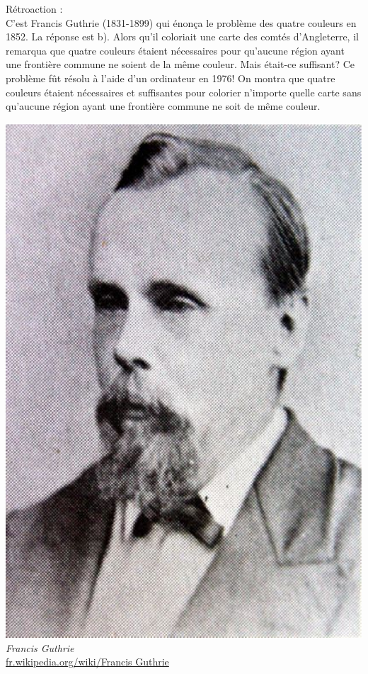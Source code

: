 \documentclass[letterpaper, 12pt]{article}
\begin{document}
R\'etroaction :\\
C'est Francis Guthrie (1831-1899) qui \'enon\c ca le probl\`eme des quatre couleurs en 1852. La r\'eponse est b). Alors qu'il coloriait une carte des comt\'es d'Angleterre, il remarqua que quatre couleurs \'etaient n\'ecessaires pour qu'aucune r\'egion ayant une fronti\`ere commune ne soient de la m\^eme couleur. Mais \'etait-ce suffisant? Ce probl\`eme f\^ut r\'esolu \`a l'aide d'un ordinateur en 1976! On montra que quatre couleurs \'etaient n\'ecessaires et suffisantes pour colorier n'importe quelle carte sans qu'aucune r\'egion ayant une fronti\`ere commune ne soit de m\^eme couleur.
\begin{center}
\includegraphics[scale=0.15]{guthrie.eps}\\
\emph{{\small Francis Guthrie}}\\
\href{http://fr.wikipedia.org/wiki/Francis_Guthrie}{fr.wikipedia.org/wiki/Francis Guthrie}\\[5mm]
\end{center}
\end{document}
